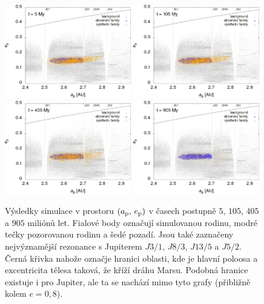 \documentclass[A4paper, 12pt, oneside]{book}
\begin{document}
\immediate{}
\immediate{}
\immediate{}
\immediate{}
\begin{figure}
	\centering
	\includegraphics[width=0.49\textwidth]{obr/ae_5t.png}
	\includegraphics[width=0.49\textwidth]{obr/ae_105t.png}\\
	\includegraphics[width=0.49\textwidth]{obr/ae_405t.png}
	\includegraphics[width=0.49\textwidth]{obr/ae_905t.png}
	\caption{Výsledky simulace v prostoru $(a_{\rm p},\,e_{\rm p})$ v časech postupně $5$, $105$, $405$ a $905$ miliónů let. Fialové body označují simulovanou rodinu, modré tečky pozorovanou rodinu a šedé pozadí. Jsou také zaznačeny nejvýznamější rezonance s Jupiterem $J3/1$, $J8/3$, $J13/5$ a $J5/2$. Černá křivka nahože označje hranici oblasti, kde je hlavní poloosa a excentricita tělesa taková, že kříží dráhu Marsu. Podobná hranice existuje i pro Jupiter, ale ta se nachází mimo tyto grafy (přibližně kolem $e=0,8$). }
\end{figure}
\end{document}
